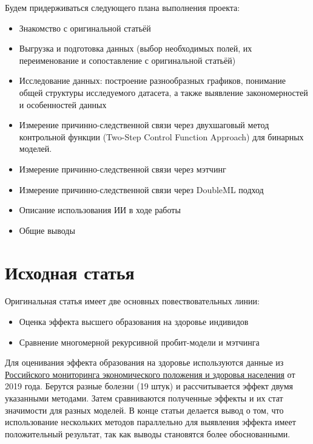 \documentclass[a4paper,12pt]{article}
\begin{document}
Будем придерживаться следующего плана выполнения проекта:
\begin{itemize}
    \item Знакомство с оригинальной статьёй
    \item Выгрузка и подготовка данных (выбор необходимых полей, их переименование и сопоставление с оригинальной статьёй)
    \item Исследование данных: построение разнообразных графиков, понимание общей структуры исследуемого датасета, а также выявление закономерностей и особенностей данных
    \item Измерение причинно-следственной связи через двухшаговый метод контрольной функции (Two-Step Control Function Approach) для бинарных моделей.
    \item Измерение причинно-следственной связи через мэтчинг
    \item Измерение причинно-следственной связи через DoubleML подход
    \item Описание использования ИИ в ходе работы
    \item Общие выводы
\end{itemize}
\section{Исходная статья}

Оригинальная статья имеет две основных повествовательных линии:
\begin{itemize}
    \item Оценка эффекта высшего образования на здоровье индивидов
    \item Сравнение многомерной рекурсивной пробит-модели и мэтчинга
\end{itemize}

Для оценивания эффекта образования на здоровье используются данные из \href{https://www.hse.ru/rlms/}{Российского мониторинга экономического положения и здоровья населения} от 2019 года.
Берутся разные болезни (19 штук) и рассчитывается эффект двумя указанными методами.
Затем сравниваются полученные эффекты и их стат значимости для разных моделей.
В конце статьи делается вывод о том, что использование нескольких методов параллельно для выявления эффекта имеет положительный результат, так как выводы становятся более обоснованными.
\end{document}
